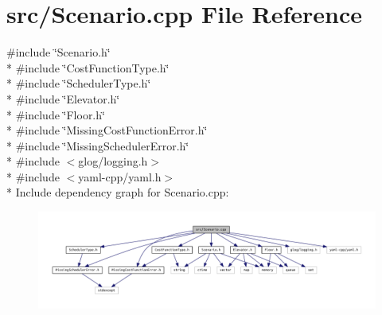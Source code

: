 \section{src/\+Scenario.cpp File Reference}
\label{_scenario_8cpp}
{\ttfamily \#include \char`\"{}Scenario.\+h\char`\"{}}\\*
{\ttfamily \#include \char`\"{}Cost\+Function\+Type.\+h\char`\"{}}\\*
{\ttfamily \#include \char`\"{}Scheduler\+Type.\+h\char`\"{}}\\*
{\ttfamily \#include \char`\"{}Elevator.\+h\char`\"{}}\\*
{\ttfamily \#include \char`\"{}Floor.\+h\char`\"{}}\\*
{\ttfamily \#include \char`\"{}Missing\+Cost\+Function\+Error.\+h\char`\"{}}\\*
{\ttfamily \#include \char`\"{}Missing\+Scheduler\+Error.\+h\char`\"{}}\\*
{\ttfamily \#include $<$glog/logging.\+h$>$}\\*
{\ttfamily \#include $<$yaml-\/cpp/yaml.\+h$>$}\\*
Include dependency graph for Scenario.\+cpp\+:
\nopagebreak
\begin{figure}[H]
\begin{center}
\leavevmode
\includegraphics[width=350pt]{_scenario_8cpp__incl}
\end{center}
\end{figure}
